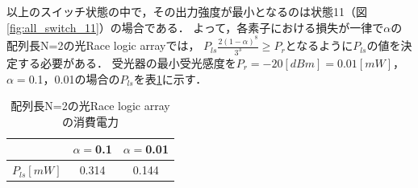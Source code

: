 以上のスイッチ状態の中で，その出力強度が最小となるのは状態11（図\ref{fig:all_switch_11}）の場合である．
よって，各素子における損失が一律で$\alpha$の
配列長N=2の光Race logic arrayでは，
$P_{ls}\frac{2(1-\alpha)^8}{3^3} \geq P_{r}$となるように$P_{ls}$の値を決定する必要がある．
受光器の最小受光感度を$P_{r}=-20[dBm]=0.01[mW]$，$\alpha = $0.1，0.01の場合の$P_{ls}$を表\ref{pls}に示す．
\begin{table}[t!]
\begin{center}
\caption{配列長N=2の光Race logic arrayの消費電力}
\begin{tabular}{|c|c|c|} \hline
&$\alpha = $0.1&$\alpha = $0.01\\ \hline \hline
$P_{ls}[mW]$&0.314&0.144\\ \hline
\end{tabular}
\label{pls}
\end{center}
\end{table}
